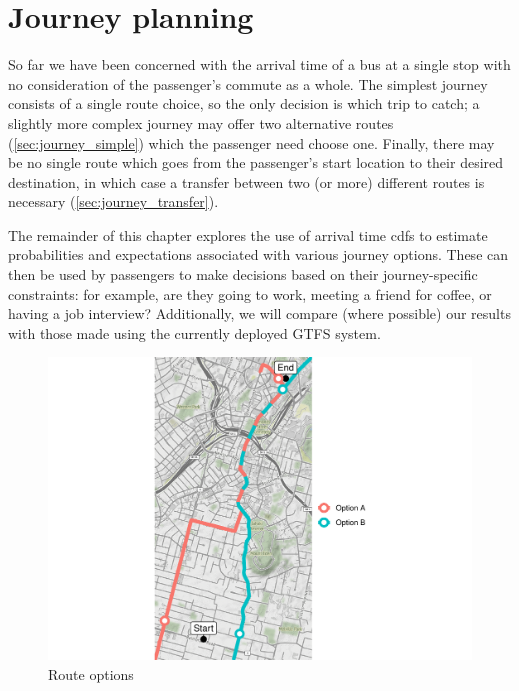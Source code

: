 \section{Journey planning}
\label{sec:etas-journey-planning}

So far we have been concerned with the arrival time of a bus at a single stop with no consideration of the passenger's commute as a whole. The simplest journey consists of a single route choice, so the only decision is which trip to catch; a slightly more complex journey may offer two alternative routes (\cref{sec:journey_simple}) which the passenger need choose one. Finally, there may be no single route which goes from the passenger's start location to their desired destination, in which case a transfer between two (or more) different routes is necessary (\cref{sec:journey_transfer}).

The remainder of this chapter explores the use of arrival time \glspl{cdf} to estimate probabilities and expectations associated with various journey options. These can then be used by passengers to make decisions based on their journey-specific constraints: for example, are they going to work, meeting a friend for coffee, or having a job interview? Additionally, we will compare (where possible) our results with those made using the currently deployed GTFS system.


\begin{knitrout}
\color{fgcolor}\begin{figure}

{\centering \includegraphics[width=\textwidth]{figure/eta_journey_arrival_prep-1} 

}

\caption[Route options]{Route options}\label{fig:eta_journey_arrival_prep}
\end{figure}


\end{knitrout}

